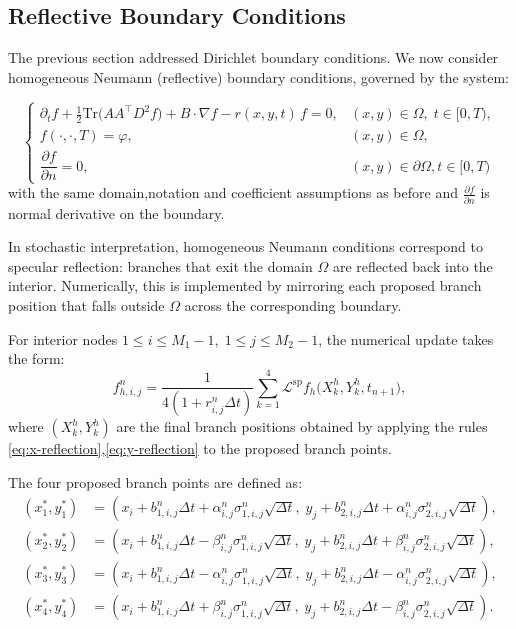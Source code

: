 \documentclass[11pt]{article}
\theoremstyle{mythm}
\theoremstyle{definition}
\begin{document}
	\subsection{Reflective Boundary Conditions}
	
	The previous section addressed Dirichlet boundary conditions. We now consider homogeneous Neumann (reflective) boundary conditions, governed by the system:
	
	\begin{equation}  \label{eq:PDE-reflective}
		\begin{cases}
			\partial_t f + \tfrac{1}{2}\mathrm{Tr}\!\big(AA^\top D^2 f\big) + B\cdot\nabla f - r(x,y,t)\,f = 0,
			& (x,y)\in\Omega,\; t\in[0,T), \\
			f(\cdot,\cdot,T)=\varphi, & (x,y)\in\Omega, \\
			\dfrac{\partial f}{\partial n} = 0, & (x,y)\in \partial\Omega,t\in[0,T)
		\end{cases}
	\end{equation}
	with the same domain,notation and coefficient assumptions as before and $\frac{\partial f}{\partial n}$ is normal derivative on the boundary.
	
	In stochastic interpretation, homogeneous Neumann conditions correspond to specular reflection: branches that exit the domain \(\Omega\) are reflected back into the interior. Numerically, this is implemented by mirroring each proposed branch position that falls outside \(\Omega\) across the corresponding boundary.
	
	For interior nodes \(1\le i\le M_1-1,\;1\le j\le M_2-1\), the numerical update takes the form:
	\begin{equation} \label{eq:interior-update}
		f_{h,i,j}^{n} = \frac{1}{4(1+r_{i,j}^n\Delta t)} \sum_{k=1}^{4}
		\mathcal{L}^{\mathrm{sp}} f_h\big(X_k^h,Y_k^h,t_{n+1}\big),
	\end{equation}
	where \((X_k^h,Y_k^h)\) are the final branch positions obtained by applying the rules \eqref{eq:x-reflection},\eqref{eq:y-reflection} to the proposed branch points.
	
	The four proposed branch points are defined as:
	\begin{equation}
		\label{pr}
		\begin{aligned}
			(x_1^*, y_1^*) &= \left( x_i + b_{1,i,j}^n \Delta t + \alpha_{i,j}^n \sigma_{1,i,j}^n \sqrt{\Delta t},\; y_j + b_{2,i,j}^n \Delta t + \alpha_{i,j}^n \sigma_{2,i,j}^n \sqrt{\Delta t} \right), \\
			(x_2^*, y_2^*) &= \left( x_i + b_{1,i,j}^n \Delta t - \beta_{i,j}^n \sigma_{1,i,j}^n \sqrt{\Delta t},\; y_j + b_{2,i,j}^n \Delta t + \beta_{i,j}^n \sigma_{2,i,j}^n \sqrt{\Delta t} \right), \\
			(x_3^*, y_3^*) &= \left( x_i + b_{1,i,j}^n \Delta t - \alpha_{i,j}^n \sigma_{1,i,j}^n \sqrt{\Delta t},\; y_j + b_{2,i,j}^n \Delta t - \alpha_{i,j}^n \sigma_{2,i,j}^n \sqrt{\Delta t} \right), \\
			(x_4^*, y_4^*) &= \left( x_i + b_{1,i,j}^n \Delta t + \beta_{i,j}^n \sigma_{1,i,j}^n \sqrt{\Delta t},\; y_j + b_{2,i,j}^n \Delta t - \beta_{i,j}^n \sigma_{2,i,j}^n \sqrt{\Delta t} \right).
		\end{aligned}
	\end{equation}
	
\end{document}
